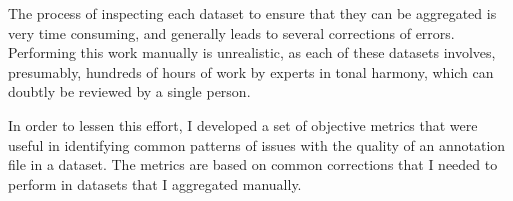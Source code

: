 


The process of inspecting each dataset to ensure that they
can be aggregated is very time consuming, and generally
leads to several corrections of errors. Performing this work
manually is unrealistic, as each of these datasets involves,
presumably, hundreds of hours of work by experts in tonal
harmony, which can doubtly be reviewed by a single person.

In order to lessen this effort, I developed a set of
objective metrics that were useful in identifying common
patterns of issues with the quality of an annotation file in
a dataset. The metrics are based on common corrections that
I needed to perform in datasets that I aggregated manually.
